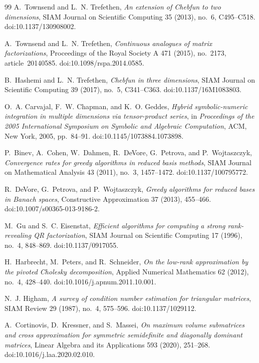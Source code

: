 \documentclass[11pt]{article}
\theoremstyle{definition}
\theoremstyle{remark}
\begin{document}
\begin{thebibliography}{99}
A.~Townsend and L.~N. Trefethen,
\emph{An extension of Chebfun to two dimensions},
SIAM Journal on Scientific Computing 35 (2013), no.~6, C495--C518.
doi:10.1137/130908002.

A.~Townsend and L.~N. Trefethen,
\emph{Continuous analogues of matrix factorizations},
Proceedings of the Royal Society A 471 (2015), no.~2173,
article~20140585.
doi:10.1098/rspa.2014.0585.

B.~Hashemi and L.~N. Trefethen,
\emph{Chebfun in three dimensions},
SIAM Journal on Scientific Computing 39 (2017), no.~5, C341--C363.
doi:10.1137/16M1083803.

O.~A. Carvajal, F.~W. Chapman, and K.~O. Geddes,
\emph{Hybrid symbolic-numeric integration in multiple dimensions via
tensor-product series},
in \emph{Proceedings of the 2005 International Symposium on Symbolic and
Algebraic Computation}, ACM, New York, 2005, pp.~84--91.
doi:10.1145/1073884.1073898.

P.~Binev, A.~Cohen, W.~Dahmen, R.~DeVore, G.~Petrova, and
P.~Wojtaszczyk,
\emph{Convergence rates for greedy algorithms in reduced basis methods},
SIAM Journal on Mathematical Analysis 43 (2011), no.~3, 1457--1472.
doi:10.1137/100795772.

R.~DeVore, G.~Petrova, and P.~Wojtaszczyk,
\emph{Greedy algorithms for reduced bases in Banach spaces},
Constructive Approximation 37 (2013), 455--466.
doi:10.1007/s00365-013-9186-2.

M.~Gu and S.~C. Eisenstat,
\emph{Efficient algorithms for computing a strong rank-revealing QR
factorization},
SIAM Journal on Scientific Computing 17 (1996), no.~4, 848--869.
doi:10.1137/0917055.

H.~Harbrecht, M.~Peters, and R.~Schneider,
\emph{On the low-rank approximation by the pivoted Cholesky decomposition},
Applied Numerical Mathematics 62 (2012), no.~4, 428--440.
doi:10.1016/j.apnum.2011.10.001.

N.~J. Higham,
\emph{A survey of condition number estimation for triangular matrices},
SIAM Review 29 (1987), no.~4, 575--596.
doi:10.1137/1029112.

A.~Cortinovis, D.~Kressner, and S.~Massei,
\emph{On maximum volume submatrices and cross approximation for symmetric
semidefinite and diagonally dominant matrices},
Linear Algebra and its Applications 593 (2020), 251--268.
doi:10.1016/j.laa.2020.02.010.


\end{thebibliography}
\end{document}
